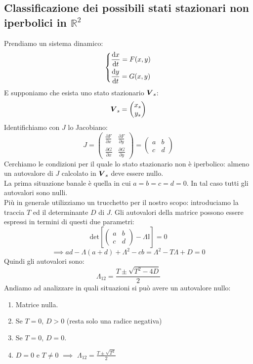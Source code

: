 \subsection{Classificazione dei possibili stati stazionari non iperbolici in $\mathbb{R}^2$}%
\label{sub:Classificazione dei possibili stati stazionari non iperbolici in R2}
Prendiamo un sistema dinamico:
\[\begin{dcases}
    \frac{\text{d} x}{\text{d} t} = F(x, y)\\
    \frac{\text{d} y}{\text{d} t} = G(x, y)
\end{dcases}\] 
E supponiamo che esista uno stato stazionario $\boldsymbol{V}_s$:
\[
    \boldsymbol{V }_s = \begin{pmatrix} x_s \\ y_s \end{pmatrix} 
\]
Identifichiamo con $J$ lo Jacobiano:
\[
    J = 
    \begin{pmatrix} 
	\frac{\partial F}{\partial x} & \frac{\partial F}{\partial y} \\
	\frac{\partial G}{\partial x} & \frac{\partial G}{\partial y} 
    \end{pmatrix} 
    = 
    \begin{pmatrix} a & b \\ c & d \end{pmatrix} 
\] 
Cerchiamo le condizioni per il quale lo stato stazionario non è iperbolico: almeno un autovalore di $J$ calcolato in $\boldsymbol{V}_s$ deve essere nullo.\\
La prima situazione banale è quella in cui $a = b = c = d = 0$. In tal caso tutti gli autovalori sono nulli. \\
Più in generale utilizziamo un trucchetto per il nostro scopo: introduciamo la traccia $T$ ed il determinante $D$ di $J$. Gli autovalori della matrice possono essere espressi in termini di questi due parametri:
\[
    \text{det}\left[\begin{pmatrix} a & b \\ c & d \end{pmatrix} - \Lambda  \mathbb{I}\right] = 0 
\] 
\[
    \implies  a d - \Lambda (a + d) + \Lambda^2 - c b = \Lambda^2 - T\Lambda + D = 0
\] 
Quindi gli autovalori sono:
\[
    \Lambda_{12} = \frac{T \pm \sqrt{T^2 - 4D}}{2}
\] 
Andiamo ad analizzare in quali situazioni si può avere un autovalore nullo: 
\begin{enumerate}
    \item Matrice nulla. 
    \item Se $T=0$, $D > 0$ (resta solo una radice negativa)
    \item Se $T = 0$, $D = 0$.
    \item $D = 0$ e $T \neq 0$ $\implies$ $\Lambda_{12} = \frac{T \pm \sqrt{T^2} }{2}$  
\end{enumerate}
